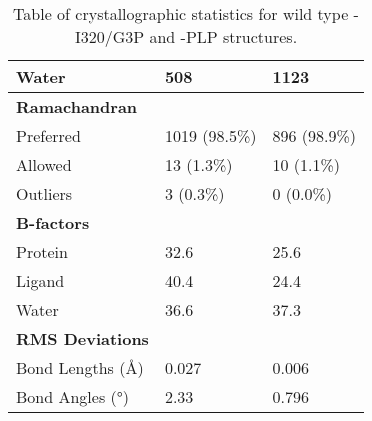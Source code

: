\begin{table}[!ht]
\begin{tabular}{|p{4cm}||P{4.25cm}|P{4.25cm}|}
 Water    &508&1123\\
 \hline
 \textbf{Ramachandran} & &\\
 Preferred &1019 (98.5\%)&896 (98.9\%)\\ 
 Allowed &13 (1.3\%)&10 (1.1\%)\\ 
 Outliers &3 (0.3\%) &0 (0.0\%)\\ 
 \hline 
 \textbf{B-factors} & &\\
 Protein &32.6&25.6\\
 Ligand &40.4&24.4\\
 Water &36.6&37.3\\
 \hline
 \textbf{RMS Deviations} & &\\
 Bond Lengths (\si{\angstrom}) &0.027&0.006\\
 Bond Angles (\si{\degree}) &2.33&0.796\\
 \hline
\end{tabular}
  \caption[Crystallographic statistics for wild type \atpdx ~structures]{Table of crystallographic statistics for wild type \atpdx -I320/G3P and \atpdx -PLP structures.}
\end{table}   





     
